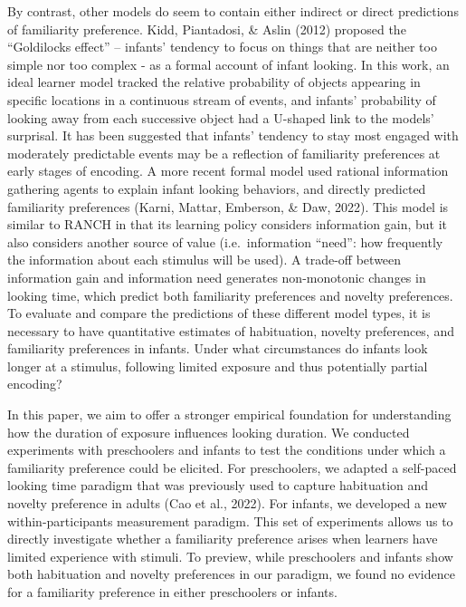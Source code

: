 \documentclass[10pt, letterpaper]{article}
\begin{document}
By contrast, other models do seem to contain either indirect or direct
predictions of familiarity preference. Kidd, Piantadosi, \& Aslin (2012)
proposed the ``Goldilocks effect'' -- infants' tendency to focus on
things that are neither too simple nor too complex - as a formal account
of infant looking. In this work, an ideal learner model tracked the
relative probability of objects appearing in specific locations in a
continuous stream of events, and infants' probability of looking away
from each successive object had a U-shaped link to the models'
surprisal. It has been suggested that infants' tendency to stay most
engaged with moderately predictable events may be a reflection of
familiarity preferences at early stages of encoding. A more recent
formal model used rational information gathering agents to explain
infant looking behaviors, and directly predicted familiarity preferences
(Karni, Mattar, Emberson, \& Daw, 2022). This model is similar to RANCH
in that its learning policy considers information gain, but it also
considers another source of value (i.e.~information ``need'': how
frequently the information about each stimulus will be used). A
trade-off between information gain and information need generates
non-monotonic changes in looking time, which predict both familiarity
preferences and novelty preferences. To evaluate and compare the
predictions of these different model types, it is necessary to have
quantitative estimates of habituation, novelty preferences, and
familiarity preferences in infants. Under what circumstances do infants
look longer at a stimulus, following limited exposure and thus
potentially partial encoding?

In this paper, we aim to offer a stronger empirical foundation for
understanding how the duration of exposure influences looking duration.
We conducted experiments with preschoolers and infants to test the
conditions under which a familiarity preference could be elicited. For
preschoolers, we adapted a self-paced looking time paradigm that was
previously used to capture habituation and novelty preference in adults
(Cao et al., 2022). For infants, we developed a new within-participants
measurement paradigm. This set of experiments allows us to directly
investigate whether a familiarity preference arises when learners have
limited experience with stimuli. To preview, while preschoolers and
infants show both habituation and novelty preferences in our paradigm,
we found no evidence for a familiarity preference in either preschoolers
or infants.
\end{document}
